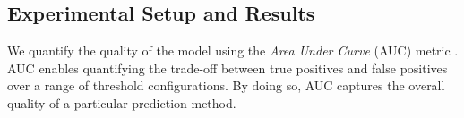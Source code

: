 \subsection{Experimental Setup and Results}
We quantify the quality of the model using the \textit{Area Under Curve} (AUC) metric \cite{AUCRef}. AUC enables quantifying the trade-off between true positives and false positives over a range of threshold configurations. By doing so, AUC captures the overall quality of a particular prediction method.


%
%

